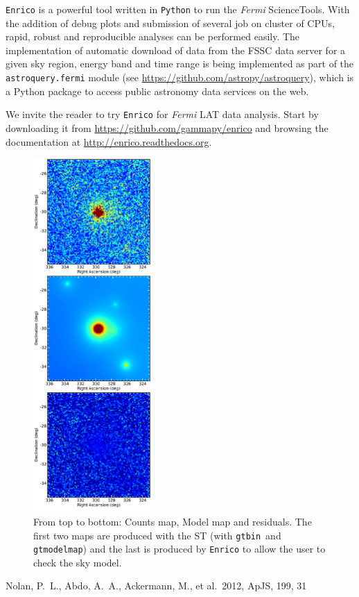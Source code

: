 \documentclass[a4paper]{article}
\newcommand{\Fermi}{\textit{Fermi} }
\begin{document}
{\tt Enrico} is a powerful tool written in {\tt Python} to run the \Fermi
ScienceTools. With the addition of debug plots and submission of several job on
cluster of CPUs, rapid, robust and reproducible analyses can be performed
easily. The implementation of automatic download of data from the FSSC data
server for a given sky region, energy band and time range is being implemented
as part of the {\tt astroquery.fermi} module (see
\url{https://github.com/astropy/astroquery}), which is a Python package to
access public astronomy data services on the web.

We invite the reader to try {\tt Enrico} for \Fermi LAT data analysis. Start by
downloading it from \url{https://github.com/gammapy/enrico} and browsing the
documentation at \url{http://enrico.readthedocs.org}.

 \begin{figure}[t]
  \centering
  \includegraphics[width=0.4\textwidth]{icrc2013_89_06}
  \caption{From top to bottom: Counts map, Model map and residuals. The first two maps are produced with the ST (with {\tt gtbin}\ and {\tt gtmodelmap}) and the last is produced by {\tt Enrico} to allow the user to check the sky model.}
  \label{fig:Map}
 \end{figure}


\begin{thebibliography}{}


 Nolan, P.~L., Abdo, A.~A., Ackermann, M., et al.\ 2012, ApJS, 199, 31 

\end{thebibliography}
\end{document}
